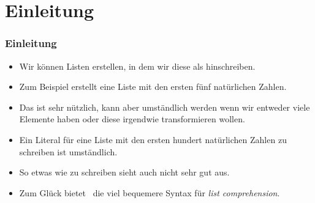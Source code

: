 \documentclass[aspectratio=169,mathserif,notheorems]{beamer}%
\subtitle{35.~List Comprehension}%
\begin{document}
%
%
\startPresentation%
%
\section{Einleitung}%
\begin{frame}%
\frametitle{Einleitung}%
\begin{itemize}%
%
\item Wir können Listen erstellen, in dem wir diese als  hinschreiben.%
%
\item<2-> Zum Beispiel erstellt \pythonil{[1, 2, 3, 4, 5]} eine Liste mit den ersten fünf natürlichen Zahlen.%
%
\item<3-> Das ist sehr nützlich, kann aber umständlich werden wenn wir entweder viele Elemente haben oder diese irgendwie transformieren wollen.%
%
\item<4-> Ein Literal für eine Liste mit den ersten hundert natürlichen Zahlen zu schreiben ist umständlich.%
%
\item<5-> So etwas wie  zu schreiben sieht auch nicht sehr gut aus.%
%
\item<6-> Zum Glück bietet \python\ die viel bequemere Syntax für \emph{list comprehension}\cite{PEP202}.%
%
\end{itemize}%
\end{frame}%
%
\end{document}
